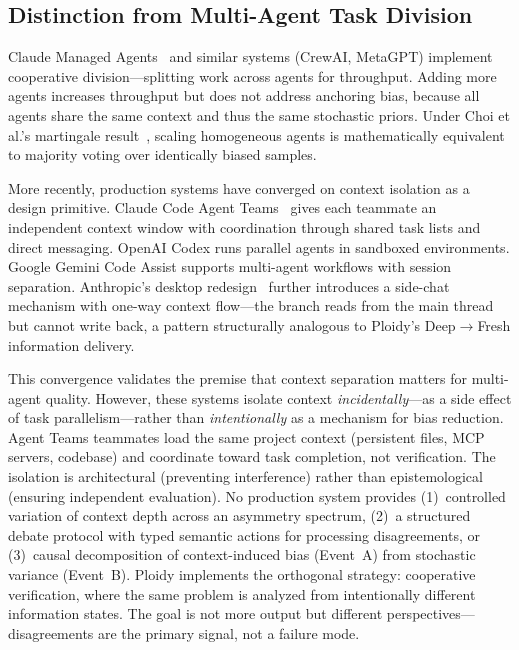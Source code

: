 \documentclass[11pt]{article}
\begin{document}
\subsection{Distinction from Multi-Agent Task Division}
\label{sec:distinction}

Claude Managed Agents~\citep{anthropic2026managedagents} and similar systems (CrewAI, MetaGPT) implement cooperative division---splitting work across agents for throughput. Adding more agents increases throughput but does not address anchoring bias, because all agents share the same context and thus the same stochastic priors. Under Choi et al.'s martingale result~\citep{choi2025debate}, scaling homogeneous agents is mathematically equivalent to majority voting over identically biased samples.

More recently, production systems have converged on context isolation as a design primitive. Claude Code Agent Teams~\citep{anthropic2026agentteams} gives each teammate an independent context window with coordination through shared task lists and direct messaging. OpenAI Codex runs parallel agents in sandboxed environments. Google Gemini Code Assist supports multi-agent workflows with session separation. Anthropic's desktop redesign~\citep{anthropic2026desktopredesign} further introduces a side-chat mechanism with one-way context flow---the branch reads from the main thread but cannot write back, a pattern structurally analogous to Ploidy's Deep$\to$Fresh information delivery.

This convergence validates the premise that context separation matters for multi-agent quality. However, these systems isolate context \emph{incidentally}---as a side effect of task parallelism---rather than \emph{intentionally} as a mechanism for bias reduction. Agent Teams teammates load the same project context (persistent files, MCP servers, codebase) and coordinate toward task completion, not verification. The isolation is architectural (preventing interference) rather than epistemological (ensuring independent evaluation). No production system provides (1)~controlled variation of context depth across an asymmetry spectrum, (2)~a structured debate protocol with typed semantic actions for processing disagreements, or (3)~causal decomposition of context-induced bias (Event~A) from stochastic variance (Event~B). Ploidy implements the orthogonal strategy: cooperative verification, where the same problem is analyzed from intentionally different information states. The goal is not more output but different perspectives---disagreements are the primary signal, not a failure mode.
\end{document}
